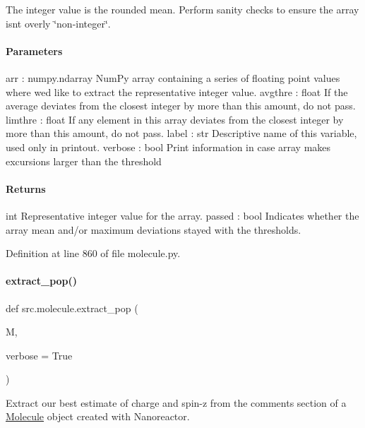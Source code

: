 The integer value is the rounded mean. Perform sanity checks to ensure the array isn\textquotesingle{}t overly \char`\"{}non-\/integer\char`\"{}.

\paragraph*{Parameters }

arr \+: numpy.\+ndarray Num\+Py array containing a series of floating point values where we\textquotesingle{}d like to extract the representative integer value. avgthre \+: float If the average deviates from the closest integer by more than this amount, do not pass. limthre \+: float If any element in this array deviates from the closest integer by more than this amount, do not pass. label \+: str Descriptive name of this variable, used only in printout. verbose \+: bool Print information in case array makes excursions larger than the threshold

\paragraph*{Returns }

int Representative integer value for the array. passed \+: bool Indicates whether the array mean and/or maximum deviations stayed with the thresholds. 

Definition at line 860 of file molecule.\+py.

\mbox{\label{namespacesrc_1_1molecule_a76b7defcd5b5e5db182fdf2f9f82f4ce}} 
\paragraph{\texorpdfstring{extract\+\_\+pop()}{extract\_pop()}}
{\footnotesize\ttfamily def src.\+molecule.\+extract\+\_\+pop (\begin{DoxyParamCaption}\item[{}]{M,  }\item[{}]{verbose = {\ttfamily True} }\end{DoxyParamCaption})}



Extract our best estimate of charge and spin-\/z from the comments section of a \hyperlink{classsrc_1_1molecule_1_1Molecule}{Molecule} object created with Nanoreactor. 

